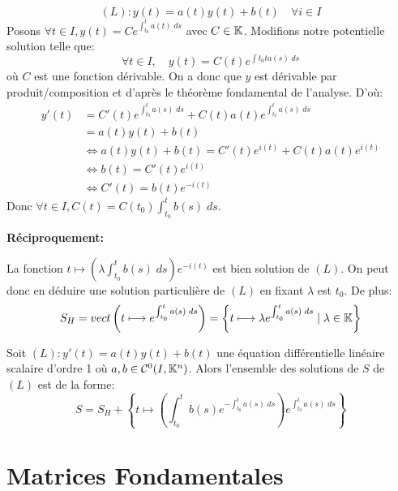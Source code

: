 \begin{remark}
		\[ (L) : y(t) = a(t) y(t) + b(t) \quad \forall i \in I \] 
	Posons $ \forall t \in I, y(t) = C e^{\int_{t_0}^{t} a(t) \; ds}$ avec $C \in \mathbb{K}$. 
	Modifions notre potentielle solution telle que: 
		\[ \forall t \in I, \quad y(t) = C(t) e^{\int{t_0}{t} a(s) \; ds} \]
	où $C$ est une fonction dérivable. On a donc que $y$ est dérivable par produit/composition
	et d'après le théorème fondamental de l'analyse. D'où: 
		\begin{align*}
			y'(t) &= C'(t) e^{\int_{t_0}^{t} a(s) \; ds} + C(t) a(t) e^{\int_{t_0}^{t} a(s) \; ds} \\
				  &= a(t)y(t) + b(t) \\
				  & \iff a(t) y(t) + b(t) = C'(t) e^{i(t)} + C(t) a(t) e^{i(t)} \\ 
				  & \iff b(t) = C'(t) e^{i(t)} \\ 
				  & \iff C'(t) = b(t) e^{-i(t)} 
		\end{align*}
	Donc $ \forall t \in I, C(t) = C(t_0) \int_{t_0}^{t} b(s) \; ds $. 
	
	\textbf{Réciproquement:}

	La fonction $ t \longmapsto \left( \lambda \int_{t_0}^{t} b(s) \; ds \right) e^{-i(t)} $ 
	est bien solution de $(L)$. On peut donc en déduire une solution particulière de $(L)$
	en fixant $\lambda$ est $t_0$. De plus: 
		\[ S_H = vect \left( t \longmapsto e^{ \int_{t_0}^{t} a(s) \; ds } \right) 
		= \left\{ t \longmapsto \lambda e^{ \int_{t_0}^{t} a(s) \; ds} \; | \; \lambda \in \mathbb{K}  \right\} \] 
\end{remark}

\begin{theorem}
	Soit $(L) : y'(t) = a(t)y(t) + b(t) $ une équation différentielle linéaire scalaire  d'ordre 1 où 
	$a,b \in \mathcal{C}^0(I, \mathbb{K}^n)$. Alors l'ensemble des solutions de $S$ de $(L)$ est de la forme: 
		\[ S = S_H + \left\{ t \longmapsto \left( \int_{t_0}^{t} b(s) e^{- \int_{t_0}^{t} a(s) \; ds} \right) e^{\int_{t_0}^{t} a(s) \; ds} \right\} \] 
\end{theorem}


\section{Matrices Fondamentales}

